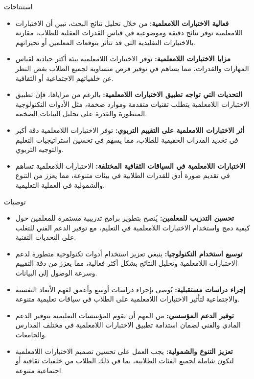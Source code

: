 		\begin{frame}{استنتاجات}
			\begin{itemize}
				\item \textbf{فعالية الاختبارات اللامعلمية:} من خلال تحليل نتائج البحث، تبين أن الاختبارات اللامعلمية توفر نتائج دقيقة وموضوعية في قياس القدرات العقلية للطلاب، مقارنة بالاختبارات التقليدية التي قد تتأثر بتوقعات المعلمين أو تحيزاتهم.
				
				\item \textbf{مزايا الاختبارات اللامعلمية:} توفر الاختبارات اللامعلمية بيئة أكثر حيادية لقياس المهارات والقدرات، مما يساهم في توفير فرص متساوية لجميع الطلاب بغض النظر عن خلفياتهم الاجتماعية أو الثقافية.
				
				\item \textbf{التحديات التي تواجه تطبيق الاختبارات اللامعلمية:} بالرغم من مزاياها، فإن تطبيق الاختبارات اللامعلمية يتطلب تقنيات متقدمة وموارد ضخمة، مثل الأدوات التكنولوجية المتطورة والقدرة على تحليل البيانات الضخمة.
				
				\item \textbf{أثر الاختبارات اللامعلمية على التقييم التربوي:} توفر الاختبارات اللامعلمية دقة أكبر في تحديد القدرات الحقيقية للطلاب، مما يسهم في تحسين استراتيجيات التعليم والتوجيه التربوي.
				
				\item \textbf{الاختبارات اللامعلمية في السياقات الثقافية المختلفة:} الاختبارات اللامعلمية تساهم في تقديم صورة أدق للقدرات الطلابية في بيئات متنوعة، مما يعزز من التنوع والشمولية في العملية التعليمية.
			\end{itemize}
		\end{frame}
		
		\begin{frame}{توصيات}
			\begin{itemize}
				\item \textbf{تحسين التدريب للمعلمين:} يُنصح بتطوير برامج تدريبية مستمرة للمعلمين حول كيفية دمج واستخدام الاختبارات اللامعلمية في التعليم، مع توفير الدعم الفني للتغلب على التحديات التقنية.
				
				\item \textbf{توسيع استخدام التكنولوجيا:} ينبغي تعزيز استخدام أدوات تكنولوجية متطورة لدعم الاختبارات اللامعلمية وتحليل النتائج بشكل أكثر فعالية، مما يعزز من دقة التقييم وسرعة الوصول إلى البيانات.
				
				\item \textbf{إجراء دراسات مستقبلية:} يُوصى بإجراء دراسات أوسع وأعمق لفهم الأبعاد النفسية والاجتماعية لتأثير الاختبارات اللامعلمية على الطلاب في سياقات تعليمية متنوعة.
				
				\item \textbf{توفير الدعم المؤسسي:} من المهم أن تقوم المؤسسات التعليمية بتوفير الدعم المادي والفني لضمان استدامة تطبيق الاختبارات اللامعلمية في مختلف المدارس والجامعات.
				
				\item \textbf{تعزيز التنوع والشمولية:} يجب العمل على تحسين تصميم الاختبارات اللامعلمية لتكون شاملة لجميع الفئات الطلابية، بما في ذلك الطلاب من خلفيات ثقافية أو اجتماعية متنوعة.
			\end{itemize}
		\end{frame}
		
